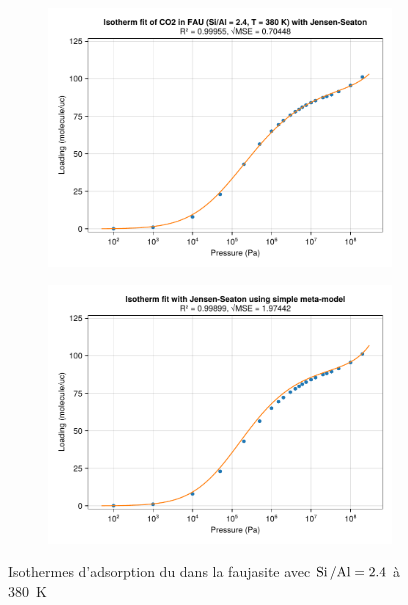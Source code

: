 \documentclass[thesis]{subfiles}
\begin{document}
\begin{otherlanguage}{french}
\begin{figure}[b]
	\begin{subfigure}{0.49\columnwidth}
		\includegraphics[width=\columnwidth]{figures/isotherms/referencefit_jsfit.pdf}
	\end{subfigure}\hfill%
	\begin{subfigure}{0.49\columnwidth}
		\includegraphics[width=\columnwidth]{figures/isotherms/referencefit_simplemodel.pdf}
	\end{subfigure}
	\caption{Isothermes d'adsorption du  dans la faujasite avec $\mbox{Si\,/Al} = 2.4$ à \qty{380}K}\label{fig_simplemodelfit}
\end{figure}


\end{otherlanguage}
\end{document}
